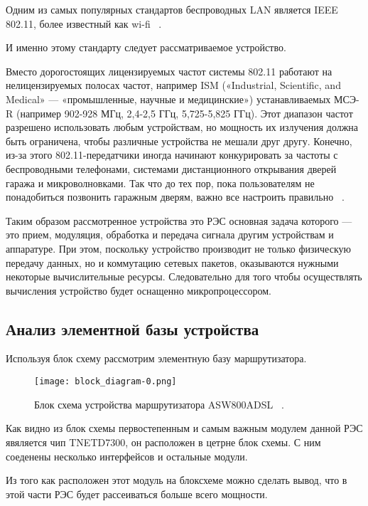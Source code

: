 Одним из самых популярных стандартов беспроводных LAN является IEEE
802.11, более известный как wi-fi ~\cite{NetworksTanenbaum2023}.

И именно этому стандарту следует рассматриваемое устройство.

Вместо дорогостоящих лицензируемых частот системы 802.11 работают на
нелицензируемых полосах частот, например ISM («Industrial, Scientific,
and Medical» — «промышленные, научные и медицинские») устанавливаемых
МСЭ-R (например 902-928 МГц, 2,4-2,5 ГГц, 5,725-5,825 ГГц).  Этот
диапазон частот разрешено использовать любым устройствам, но мощность
их излучения должна быть ограничена, чтобы различные устройства не
мешали друг другу. Конечно, из-за этого 802.11-передатчики иногда
начинают конкурировать за частоты с беспроводными телефонами,
системами дистанционного открывания дверей гаража и микроволновками.
Так что до тех пор, пока пользователям не понадобиться позвонить
гаражным дверям, важно все настроить
правильно ~\cite{NetworksTanenbaum2023}.

Таким образом рассмотренное устройства это РЭС основная задача
которого — это прием, модуляция, обработка и передача сигнала другим
устройствам и аппаратуре. При этом, поскольку устройство производит не
только физическую передачу данных, но и коммутацию сетевых пакетов,
оказываются нужными некоторые вычислительные ресурсы.
Следовательно для того чтобы осуществлять вычисления устройство будет
оснащенно микропроцессором.

\subsection{Анализ элементной базы устройства}

Используя блок схему рассмотрим элементную базу
маршрутизатора.


\begin{figure}[h] %
  \centering
\texttt{[image: block\_diagram-0.png]}
\caption{Блок схема устройства маршрутизатора ASW800ADSL ~\cite{BLOCK_DIAGRAM}.}
\end{figure}
 
Как видно из блок схемы первостепенным и самым важным модулем данной
РЭС явяляется чип TNETD7300, он расположен в цетрне блок схемы. С ним
соеденены несколько интерфейсов и остальные модули.

Из того как расположен этот модуль на блоксхеме можно сделать вывод,
что в этой части РЭС будет рассеиваться больше всего мощности.

